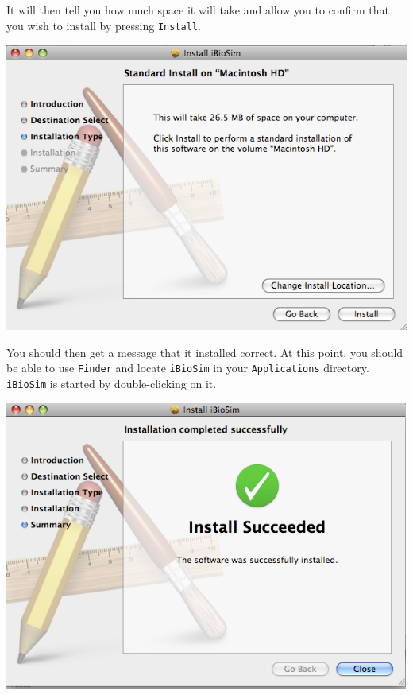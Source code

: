 \documentclass[titlepage,11pt]{article}
\begin{document}
\clearpage

It will then tell you how much space it will take and allow you to
confirm that you wish to install by pressing {\tt Install}.

\includegraphics[height=95mm]{screenshots/installType}

You should then get a message that it installed correct.  At this
point, you should be able to use {\tt Finder} and locate {\tt iBioSim}
in your {\tt Applications} directory.  {\tt iBioSim} is started by
double-clicking on it.

\includegraphics[height=95mm]{screenshots/success}
\end{document}
